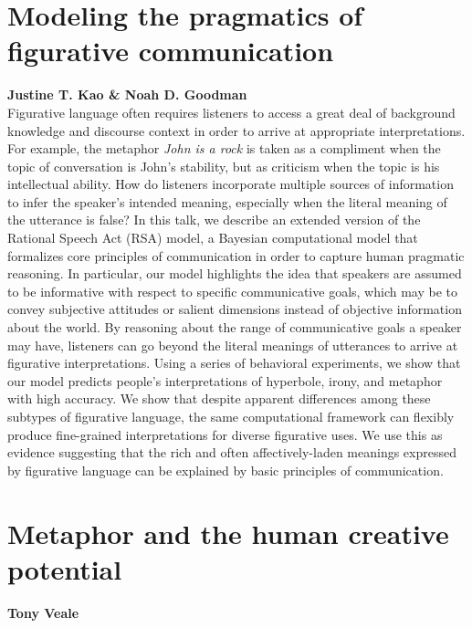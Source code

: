 \documentclass[10pt,letterpaper]{article}
\begin{document}
\section{Modeling the pragmatics of figurative communication}
\large \textbf{Justine T. Kao \& Noah D. Goodman}\\
Figurative language often requires listeners to access a great deal of background knowledge and discourse context in order to arrive at appropriate interpretations. For example, the metaphor \emph{John is a rock} is taken as a compliment when the topic of conversation is John's stability, but as criticism when the topic is his intellectual ability. How do listeners incorporate multiple sources of information to infer the speaker's intended meaning, especially when the literal meaning of the utterance is false? In this talk, we describe an extended version of the Rational Speech Act (RSA) model, a Bayesian computational model that formalizes core principles of communication in order to capture human pragmatic reasoning. In particular, our model highlights the idea that speakers are assumed to be informative with respect to specific communicative goals, which may be to convey subjective attitudes or salient dimensions instead of objective information about the world. By reasoning about the range of communicative goals a speaker may have, listeners can go beyond the literal meanings of utterances to arrive at figurative interpretations. Using a series of behavioral experiments, we show that our model predicts people's interpretations of hyperbole, irony, and metaphor with high accuracy. We show that despite apparent differences among these subtypes of figurative language, the same computational framework can flexibly produce fine-grained interpretations for diverse figurative uses. We use this as evidence suggesting that the rich and often affectively-laden meanings expressed by figurative language can be explained by basic principles of communication.


\section{Metaphor and the human creative potential}
\large \textbf{Tony Veale}
\end{document}
